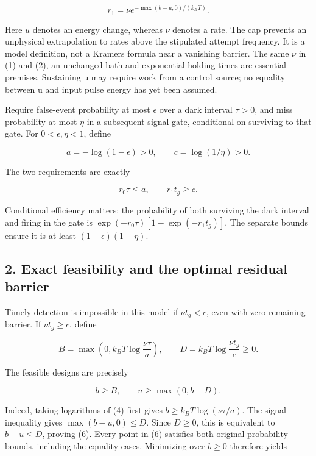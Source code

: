\documentclass[11pt,a4paper]{article}
\begin{document}
\[r_1=\nu e^{-\max(b-u,0)/(k_BT)}. \tag{2}\]

Here \(u\) denotes an energy change, whereas \(\nu\) denotes a rate. The
cap prevents an unphysical extrapolation to rates above the stipulated
attempt frequency. It is a model definition, not a Kramers formula near
a vanishing barrier. The same \(\nu\) in (1) and (2), an unchanged bath
and exponential holding times are essential premises. Sustaining u may
require work from a control source; no equality between u and input
pulse energy has yet been assumed.

Require false-event probability at most \(\epsilon\) over a dark
interval \(\tau>0\), and miss probability at most \(\eta\) in a
subsequent signal gate, conditional on surviving to that gate. For
\(0<\epsilon,\eta<1\), define

\[a=-\log(1-\epsilon)>0,\qquad c=\log(1/\eta)>0. \tag{3}\]

The two requirements are exactly

\[r_0\tau\le a,\qquad r_1t_g\ge c. \tag{4}\]

Conditional efficiency matters: the probability of both surviving the
dark interval and firing in the gate is
\(\exp(-r_0\tau)[1-\exp(-r_1t_g)]\). The separate bounds ensure it is at
least \((1-\epsilon)(1-\eta)\).

\hypertarget{exact-feasibility-and-the-optimal-residual-barrier}{%
\subsection{2. Exact feasibility and the optimal residual
barrier}\label{exact-feasibility-and-the-optimal-residual-barrier}}

Timely detection is impossible in this model if \(\nu t_g<c\), even with
zero remaining barrier. If \(\nu t_g\ge c\), define

\[B=\max\!\left(0,k_BT\log\frac{\nu\tau}{a}\right),\qquad
D=k_BT\log\frac{\nu t_g}{c}\ge0. \tag{5}\]

The feasible designs are precisely

\[b\ge B,\qquad u\ge\max(0,b-D). \tag{6}\]

Indeed, taking logarithms of (4) first gives
\(b\ge k_BT\log(\nu\tau/a)\). The signal inequality gives
\(\max(b-u,0)\le D\). Since \(D\ge0\), this is equivalent to
\(b-u\le D\), proving (6). Every point in (6) satisfies both original
probability bounds, including the equality cases. Minimizing over
\(b\ge0\) therefore yields
\end{document}
